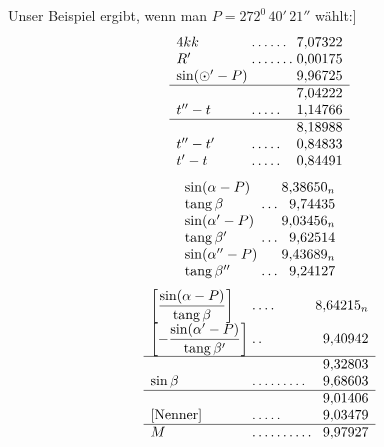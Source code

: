 Unser Beispiel ergibt, wenn man \(P=272^{0}\,40'\,21''\) wählt:]
\[
\begin{array}{l@{\;}l@{\;}r}
4kk&\mathord{.}\,\mathord{.}\,\mathord{.}\,\mathord{.}\,\mathord{.}\,\mathord{.}&7{,}07322\\
R'&\mathord{.}\,\mathord{.}\,\mathord{.}\,\mathord{.}\,\mathord{.}\,\mathord{.}\,\mathord{.}&0{,}00175\\
\sin(\odot'-P)&&9{,}96725\\\hline
&&7{,}04222\\
t''-t&\mathord{.}\,\mathord{.}\,\mathord{.}\,\mathord{.}\,\mathord{.}&1{,}14766\\\hline
&&8{,}18988\\
t''-t'&\mathord{.}\,\mathord{.}\,\mathord{.}\,\mathord{.}\,\mathord{.}&0{,}84833\\
t'-t&\mathord{.}\,\mathord{.}\,\mathord{.}\,\mathord{.}\,\mathord{.}&0{,}84491
\end{array}
\]
\[
\begin{array}{l@{\;}l@{\;}r}
\sin(\alpha-P)&&8{,}38650_n\\
\operatorname{tang}\beta&\mathord{.}\,\mathord{.}\,\mathord{.}&9{,}74435\\
\sin(\alpha'-P)&&9{,}03456_n\\
\operatorname{tang}\beta'&\mathord{.}\,\mathord{.}\,\mathord{.}&9{,}62514\\
\sin(\alpha''-P)&&9{,}43689_n\\
\operatorname{tang}\beta''&\mathord{.}\,\mathord{.}\,\mathord{.}&9{,}24127
\end{array}
\]
\[
\begin{array}{l@{\;}l@{\;}r}
\left[\dfrac{\sin(\alpha-P)}{\operatorname{tang}\beta}\right]&\mathord{.}\,\mathord{.}\,\mathord{.}\,\mathord{.}&8{,}64215_n\\[3pt]
\left[-\dfrac{\sin(\alpha'-P)}{\operatorname{tang}\beta'}\right]&\mathord{.}\,\mathord{.}&9{,}40942\\[3pt]\hline
&&9{,}32803\\
\sin\beta&\mathord{.}\,\mathord{.}\,\mathord{.}\,\mathord{.}\,\mathord{.}\,\mathord{.}\,\mathord{.}\,\mathord{.}\,\mathord{.}&9{,}68603\\\hline
&&9{,}01406\\
{}[\text{Nenner}]&\mathord{.}\,\mathord{.}\,\mathord{.}\,\mathord{.}\,\mathord{.}&9{,}03479\\\hline
M&\mathord{.}\,\mathord{.}\,\mathord{.}\,\mathord{.}\,\mathord{.}\,\mathord{.}\,\mathord{.}\,\mathord{.}\,\mathord{.}\,\mathord{.}&9{,}97927
\end{array}
\]
